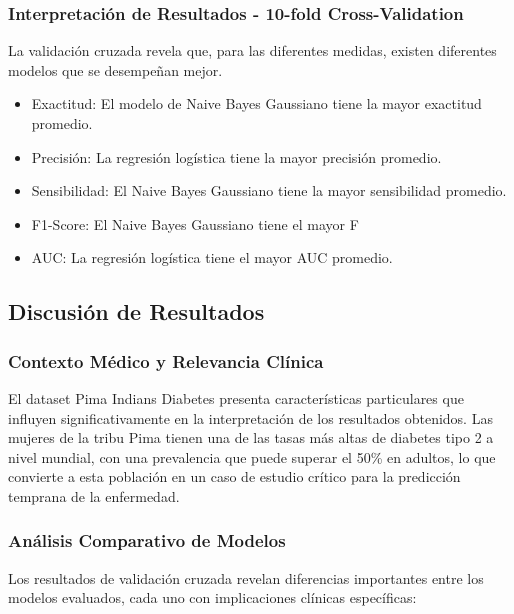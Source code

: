 \documentclass[12pt,a4paper]{article}
\begin{document}
\subsubsection{Interpretación de Resultados - 10-fold Cross-Validation}

La validación cruzada revela que, para las diferentes medidas, existen diferentes modelos que se desempeñan mejor.

\begin{itemize}
\item Exactitud: El modelo de Naive Bayes Gaussiano tiene la mayor exactitud promedio.
\item Precisión: La regresión logística tiene la mayor precisión promedio.
\item Sensibilidad: El Naive Bayes Gaussiano tiene la mayor sensibilidad promedio.
\item F1-Score: El Naive Bayes Gaussiano tiene el mayor F
\item AUC: La regresión logística tiene el mayor AUC promedio.
\end{itemize}

\subsection{Discusión de Resultados}

\subsubsection{Contexto Médico y Relevancia Clínica}

El dataset Pima Indians Diabetes presenta características particulares que influyen significativamente en la interpretación de los resultados obtenidos. Las mujeres de la tribu Pima tienen una de las tasas más altas de diabetes tipo 2 a nivel mundial, con una prevalencia que puede superar el 50\% en adultos, lo que convierte a esta población en un caso de estudio crítico para la predicción temprana de la enfermedad.

\subsubsection{Análisis Comparativo de Modelos}

Los resultados de validación cruzada revelan diferencias importantes entre los modelos evaluados, cada uno con implicaciones clínicas específicas:

\vspace{0.5cm}
\end{document}
